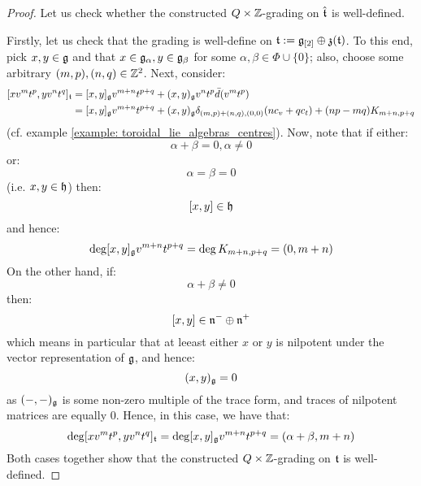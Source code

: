             \begin{proof}
                Let us check whether the constructed $Q \x \Z$-grading on $\hat{\mathfrak{t}}$ is well-defined.
    
                Firstly, let us check that the grading is well-define on $\mathfrak{t} := \mathfrak{g}_{[2]} \oplus \mathfrak{z}(\mathfrak{t})$. To this end, pick $x, y \in \mathfrak{g}$ and that $x \in \mathfrak{g}_{\alpha}, y \in \mathfrak{g}_{\beta}$ for some $\alpha, \beta \in \Phi \cup \{0\}$; also, choose some arbitrary $(m, p), (n, q) \in \mathbb{Z}^2$. Next, consider:
                    $$
                        \begin{aligned}
                            [x v^m t^p, y v^n t^q]_{\toroidal} & = [x, y]_{\g} v^{m + n} t^{p + q} + (x, y)_{\g} v^n t^p \bar{d}(v^m t^p)
                            \\
                            & = [x, y]_{\g} v^{m + n} t^{p + q} + (x, y)_{\g} \delta_{(m, p) + (n, q), (0, 0)} ( n c_v + q c_t ) + (np - mq) K_{m + n, p + q}
                        \end{aligned}
                    $$
                (cf. example \ref{example: toroidal_lie_algebras_centres}). Now, note that if either:
                    $$\alpha + \beta = 0, \alpha \not = 0$$
                or:
                    $$\alpha = \beta = 0$$
                (i.e. $x, y \in \mathfrak{h}$) then:
                    $$[x, y] \in \mathfrak{h}$$
                and hence:
                    $$\deg [x, y]_{\mathfrak{g}} v^{m + n} t^{p + q} = \deg K_{m + n, p + q} = (0, m + n)$$
                On the other hand, if:
                    $$\alpha + \beta \not = 0$$
                then:
                    $$[x, y] \in \mathfrak{n}^- \oplus \mathfrak{n}^+$$
                which means in particular that at leeast either $x$ or $y$ is nilpotent under the vector representation of $\mathfrak{g}$, and hence:
                    $$(x, y)_{\mathfrak{g}} = 0$$
                as $(-, -)_{\mathfrak{g}}$ is some non-zero multiple of the trace form, and traces of nilpotent matrices are equally $0$. Hence, in this case, we have that:
                    $$\deg [x v^m t^p, y v^n t^q]_{\mathfrak{t}} = \deg [x, y]_{\mathfrak{g}} v^{m + n} t^{p + q} = (\alpha + \beta, m + n)$$
                Both cases together show that the constructed $Q \x \Z$-grading on $\mathfrak{t}$ is well-defined. 
                

\end{proof}
